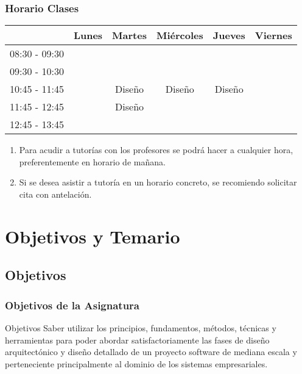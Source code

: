 \documentclass[a4paper,slidestop,xcolor=pst,blue]{beamer}
\begin{document}
\begin{frame}[c]
	\frametitle{Horario Clases}
	\begin{small}
	\begin{center}
	\begin{tabular}{||l|c|c|c|c|c||}
	\hline \hline
				   & Lunes  & Martes  & Miércoles   & Jueves      & Viernes      \\ \hline \hline
    08:30 - 09:30  &        &         &             &             &              \\ \hline
	09:30 - 10:30  &        &         &             &             &              \\ \hline
	10:45 - 11:45  &        & Diseño  & Diseño      & Diseño      &              \\ \hline
	11:45 - 12:45  &        & Diseño  &             &             &              \\ \hline
	12:45 - 13:45  &        &         &             &             &              \\ \hline \hline
	\end{tabular}
	\end{center}
	\end{small}
    \begin{enumerate}
        \item<2-> Para acudir a tutorías con los profesores se podrá hacer a cualquier hora, preferentemente en horario de mañana.
        \item<3-> Si se desea asistir a tutoría en un horario concreto, se recomiendo solicitar cita con antelación.
    \end{enumerate}
\end{frame}

\section{Objetivos y Temario}

\subsection{Objetivos}

\begin{frame}[c]
	\frametitle{Objetivos de la Asignatura}
	\begin{block}{Objetivos}
        Saber utilizar los principios, fundamentos, métodos, técnicas y herramientas para poder abordar satisfactoriamente las fases de \alert{diseño arquitectónico} y \alert{diseño detallado} de un proyecto software de mediana escala y perteneciente principalmente al dominio de los sistemas empresariales.
	\end{block}
\end{frame}
\end{document}
